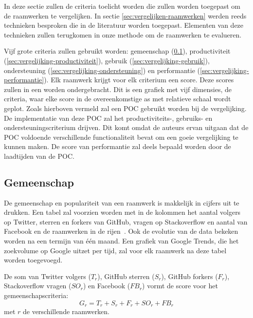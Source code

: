 In deze sectie zullen de criteria toelicht worden die zullen worden toegepast om de raamwerken te vergelijken.
In sectie \ref{sec:vergelijken-raamwerken} werden reeds technieken besproken die in de literatuur worden toegepast.
Elementen van deze technieken zullen terugkomen in onze methode om de raamwerken te evalueren.

Vijf grote criteria zullen gebruikt worden:  gemeenschap (\ref{sec:vergelijking-gemeenschap}), productiviteit (\ref{sec:vergelijking-productiviteit}), gebruik (\ref{sec:vergelijking-gebruik}), ondersteuning (\ref{sec:vergelijking-ondersteuning}) en performantie (\ref{sec:vergelijking-performantie}). 
Elk raamwerk krijgt voor elk criterium een score. 
Deze scores zullen in een  worden ondergebracht.  
Dit is een grafiek met vijf dimensies,  de criteria,     waar elke score in de overeenkomstige as met relatieve schaal wordt geplot.
Zoals hierboven vermeld zal een POC gebruikt worden bij de vergelijking.
De implementatie van deze POC zal het productiviteits-, gebruiks- en ondersteuningscriterium drijven.  
Dit komt omdat de auteurs ervan uitgaan dat de POC voldoende verschillende functionaliteit bevat om een goeie vergelijking te kunnen maken.
De score van performantie zal deels bepaald worden door de laadtijden van de POC.

\subsection{Gemeenschap}
\label{sec:vergelijking-gemeenschap}
De gemeenschap en populariteit van een raamwerk is makkelijk in cijfers uit te drukken. 
Een tabel zal voorzien worden met in de kolommen het aantal volgers op Twitter, sterren en forkers van GitHub,  vragen op Stackoverflow en aantal  van Facebook en de raamwerken in de rijen~\cite{Sarrafi2012a,Ayuso2012}. 
Ook de evolutie van de data bekeken worden na een termijn van één maand.
Een grafiek van Google Trends, die het zoekvolume op Google uitzet per tijd, zal voor elk raamwerk na deze tabel worden toegevoegd.


De som van Twitter volgers ($T_r$), GitHub sterren ($S_r$), GitHub forkers ($F_r$), Stackoverflow vragen ($SO_r$) en Facebook  ($FB_r$) vormt de score voor het gemeenschapscriteria:
\begin{equation}
  G_r=T_r+S_r+F_r+SO_r+FB_r
  \label{eq:gemeenschap}
\end{equation}
met $r$ de verschillende raamwerken.

